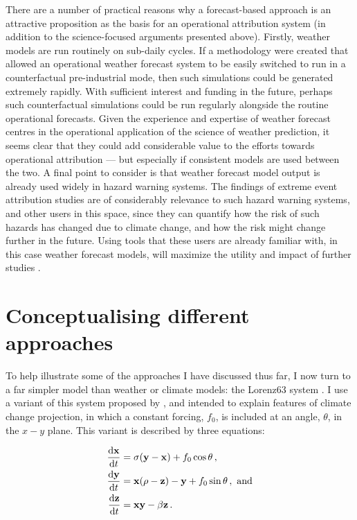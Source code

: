       There are a number of practical reasons why a forecast-based approach is an attractive proposition as the basis for an operational attribution system (in addition to the science-focused arguments presented above). Firstly, weather models are run routinely on sub-daily cycles. If a methodology were created that allowed an operational weather forecast system to be easily switched to run in a counterfactual pre-industrial mode, then such simulations could be generated extremely rapidly. With sufficient interest and funding in the future, perhaps such counterfactual simulations could be run regularly alongside the routine operational forecasts. Given the experience and expertise of weather forecast centres in the operational application of the science of weather prediction, it seems clear that they could add considerable value to the efforts towards operational attribution \citep{wehner_operational_2022} --- but especially if consistent models are used between the two. A final point to consider is that weather forecast model output is already used widely in hazard warning systems. The findings of extreme event attribution studies are of considerably relevance to such hazard warning systems, and other users in this space, since they can quantify how the risk of such hazards has changed due to climate change, and how the risk might change further in the future. Using tools that these users are already familiar with, in this case weather forecast models, will maximize the utility and impact of further studies \citep{schaller_role_2020}.

\section{Conceptualising different approaches}\label{intro:conceptualising}

  To help illustrate some of the approaches I have discussed thus far, I now turn to a far simpler model than weather or climate models: the Lorenz63 system \citep{lorenz_deterministic_1963}. I use a variant of this system proposed by \citet{palmer_nonlinear_1999}, and intended to explain features of climate change projection, in which a constant forcing, $f_0$, is included at an angle, $\theta$, in the $x-y$ plane. This variant is described by three equations:

  \begin{align*}
    \frac{\mathrm{d}\mathbf{x}}{\mathrm{d}t} & = \sigma(\mathbf{y}-\mathbf{x}) + f_0 \cos\theta\,, \\
    \frac{\mathrm{d}\mathbf{y}}{\mathrm{d}t} & = \mathbf{x} (\rho - \mathbf{z}) - \mathbf{y} + f_0 \sin\theta\,, \ \textnormal{and} \\
    \frac{\mathrm{d}\mathbf{z}}{\mathrm{d}t} & = \mathbf{xy} - \beta \mathbf{z}\,.
  \end{align*}

